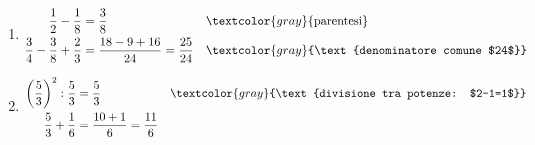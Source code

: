 \begin{question}[ID=2.1, subtitle={Calcolo di espressioni frazionarie — serie 1}, tags={espressioni, frazionarie}, difficulty=facile]
\begin{explanation}
\begin{enumerate}
\[\begin{aligned}
    \end{aligned}\]
    \item \[\begin{aligned}
    \dfrac12-\dfrac18 &= \dfrac38 && \textcolor{gray}{\text{parentesi}}\\
    \dfrac34-\dfrac38+\dfrac23 &= \dfrac{18-9+16}{24}=\dfrac{25}{24} && \textcolor{gray}{\text{denominatore comune $24$}}
    \end{aligned}\]
    \item \[\begin{aligned}
    \left(\dfrac53\right)^2:\dfrac53 &= \dfrac53 && \textcolor{gray}{\text{divisione tra potenze: $2-1=1$}}\\
    \dfrac53+\dfrac16 &= \dfrac{10+1}{6}=\dfrac{11}{6}
    \end{aligned}\]
\end{enumerate}
\end{explanation}
\end{question}


